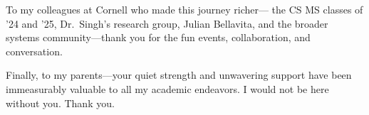 \begin{acknowledgements}
    To my colleagues at Cornell who made this journey richer—
    the CS MS classes of ’24 and ’25, Dr.\ Singh’s research group,
    Julian Bellavita, and the broader systems community—thank you for the fun events, collaboration, and conversation.

    Finally, to my parents—your quiet strength and
    unwavering support have been immeasurably valuable to all my academic endeavors.
    I would not be here without you.
    Thank you.
\end{acknowledgements}